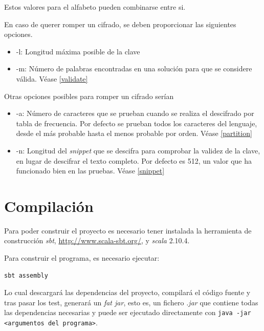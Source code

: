 \documentclass[12pt]{report}
\begin{document}
Estos valores para el alfabeto pueden combinarse entre si.


En caso de querer romper un cifrado, se deben proporcionar las siguientes opciones.
\begin{itemize}
\item -l: Longitud máxima posible de la clave
\item -m: Número de palabras encontradas en una solución para que se considere válida. Véase \ref{validate}
\end{itemize}

Otras opciones posibles para romper un cifrado serían
\begin{itemize}
\item -a: Número de caracteres que se prueban cuando se realiza el descifrado por tabla de frecuencia. Por defecto
se prueban todos los caracteres del lenguaje, desde el más probable hasta el menos probable por orden. Véase \ref{partition}
\item -n: Longitud del \textit{snippet} que se descifra para comprobar la validez de la clave, en lugar de descifrar el texto 
completo. Por defecto es 512, un valor que ha funcionado bien en las pruebas. Véase \ref{snippet}
\end{itemize}

\section{Compilación}
Para poder construir el proyecto es necesario tener instalada la herramienta de construcción \textit{sbt}, \url{http://www.scala-sbt.org/}, y \textit{scala} 2.10.4.

Para construir el programa, es necesario ejecutar:
\begin{verbatim}
sbt assembly
\end{verbatim}

Lo cual descargará las dependencias del proyecto, compilará el código fuente y tras pasar los test, generará un \textit{fat jar}, esto es, un fichero \textit{.jar} que contiene todas las dependencias necesarias y puede ser ejecutado directamente con \texttt{java -jar <argumentos del programa>}.
\end{document}
